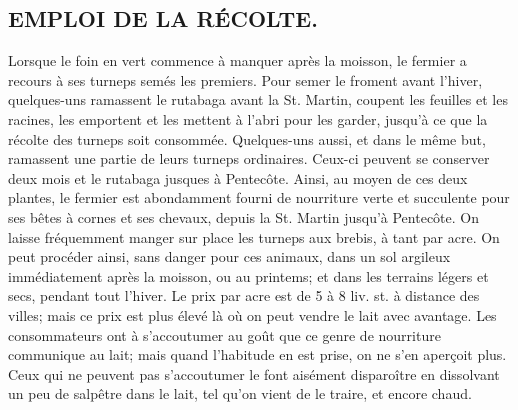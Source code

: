 \subsection{EMPLOI DE LA RÉCOLTE.} Lorsque le foin\setcounter{page}{119} en vert commence à manquer après la moisson, le fermier a recours à ses turneps semés les premiers. Pour semer le froment avant l'hiver, quelques-uns ramassent le rutabaga avant la St. Martin, coupent les feuilles et les racines, les emportent et les mettent à l'abri pour les garder, jusqu'à ce que la récolte des turneps soit consommée. Quelques-uns aussi, et dans le même but, ramassent une partie de leurs turneps ordinaires. Ceux-ci peuvent se conserver deux mois et le rutabaga jusques à Pentecôte. Ainsi, au moyen de ces deux plantes, le fermier est abondamment fourni de nourriture verte et succulente pour ses bêtes à cornes et ses chevaux, depuis la St. Martin jusqu'à Pentecôte.
On laisse fréquemment manger sur place les turneps aux brebis, à tant par acre. On peut procéder ainsi, sans danger pour ces animaux, dans un sol argileux immédiatement après la moisson, ou au printems; et dans les terrains légers et secs, pendant tout l'hiver. Le prix par acre est de 5 à 8 liv. st. à distance des villes; mais ce prix est plus élevé là où on peut vendre le lait avec avantage. Les consommateurs ont à s'accoutumer au goût que ce genre de nourriture communique au lait; mais quand l'habitude en est\setcounter{page}{120} 
prise, on ne s’en aperçoit plus. Ceux qui ne peuvent pas s’accoutumer le font aisément disparoître en dissolvant un peu de salpêtre dans le lait, tel qu’on vient de le traire, et encore chaud.
